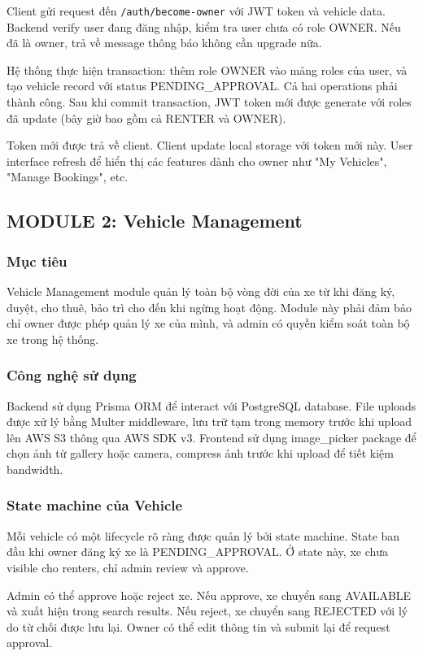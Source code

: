 Client gửi request đến \texttt{/auth/become-owner} với JWT token và vehicle data. Backend verify user đang đăng nhập, kiểm tra user chưa có role OWNER. Nếu đã là owner, trả về message thông báo không cần upgrade nữa.

Hệ thống thực hiện transaction: thêm role OWNER vào mảng roles của user, và tạo vehicle record với status PENDING\_APPROVAL. Cả hai operations phải thành công. Sau khi commit transaction, JWT token mới được generate với roles đã update (bây giờ bao gồm cả RENTER và OWNER).

Token mới được trả về client. Client update local storage với token mới này. User interface refresh để hiển thị các features dành cho owner như "My Vehicles", "Manage Bookings", etc.

\subsection{MODULE 2: Vehicle Management}

\subsubsection{Mục tiêu}
Vehicle Management module quản lý toàn bộ vòng đời của xe từ khi đăng ký, duyệt, cho thuê, bảo trì cho đến khi ngừng hoạt động. Module này phải đảm bảo chỉ owner được phép quản lý xe của mình, và admin có quyền kiểm soát toàn bộ xe trong hệ thống.

\subsubsection{Công nghệ sử dụng}
Backend sử dụng Prisma ORM để interact với PostgreSQL database. File uploads được xử lý bằng Multer middleware, lưu trữ tạm trong memory trước khi upload lên AWS S3 thông qua AWS SDK v3. Frontend sử dụng image\_picker package để chọn ảnh từ gallery hoặc camera, compress ảnh trước khi upload để tiết kiệm bandwidth.

\subsubsection{State machine của Vehicle}
Mỗi vehicle có một lifecycle rõ ràng được quản lý bởi state machine. State ban đầu khi owner đăng ký xe là PENDING\_APPROVAL. Ở state này, xe chưa visible cho renters, chỉ admin review và approve.

Admin có thể approve hoặc reject xe. Nếu approve, xe chuyển sang AVAILABLE và xuất hiện trong search results. Nếu reject, xe chuyển sang REJECTED với lý do từ chối được lưu lại. Owner có thể edit thông tin và submit lại để request approval.


